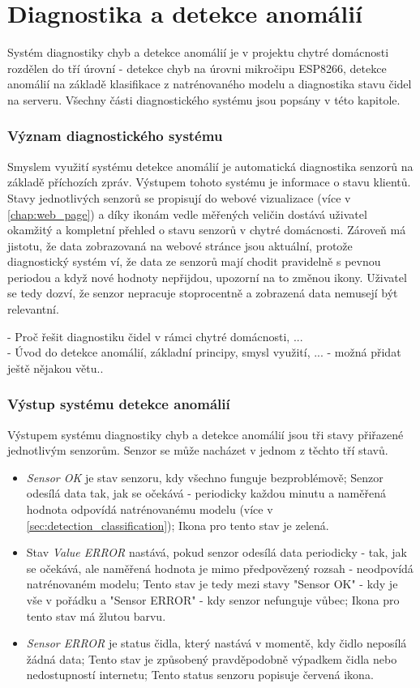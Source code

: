 \chapter{Diagnostika a detekce anomálií} \label{chap:diagnostics}
Systém diagnostiky chyb a detekce anomálií je v projektu chytré domácnosti rozdělen do tří úrovní - detekce chyb na úrovni mikročipu ESP8266, detekce anomálií na základě klasifikace z natrénovaného modelu a diagnostika stavu čidel na serveru. Všechny části diagnostického systému jsou popsány v této kapitole. 

\subsection*{Význam diagnostického systému}
Smyslem využití systému detekce anomálií je automatická diagnostika senzorů na základě příchozích zpráv. Výstupem tohoto systému je informace o stavu klientů. Stavy jednotlivých senzorů se propisují do webové vizualizace (více v \cref{chap:web_page}) a díky ikonám vedle měřených veličin dostává uživatel okamžitý a kompletní přehled o stavu senzorů v chytré domácnosti. Zároveň má jistotu, že data zobrazovaná na webové stránce jsou aktuální, protože diagnostický systém ví, že data ze senzorů mají chodit pravidelně s pevnou periodou a když nové hodnoty nepřijdou, upozorní na to změnou ikony. Uživatel se tedy dozví, že senzor nepracuje stoprocentně a zobrazená data nemusejí být relevantní.

- Proč řešit diagnostiku čidel v rámci chytré domácnosti, ...\\
- Úvod do detekce anomálií, základní principy, smysl využití, ... - možná přidat ještě nějakou větu..

\subsection*{Výstup systému detekce anomálií}
Výstupem systému diagnostiky chyb a detekce anomálií jsou tři stavy přiřazené jednotlivým senzorům. Senzor se může nacházet v jednom z těchto tří stavů. 

\begin{itemize}
  \item \textit{Sensor OK} je stav senzoru, kdy všechno funguje bezproblémově; Senzor odesílá data tak, jak se očekává - periodicky každou minutu a naměřená hodnota odpovídá natrénovanému modelu (více v \cref{sec:detection_classification}); Ikona pro tento stav je zelená.
  \item Stav \textit{Value ERROR} nastává, pokud senzor odesílá data periodicky - tak, jak se očekává, ale naměřená hodnota je mimo předpovězený rozsah - neodpovídá natrénovaném modelu; Tento stav je tedy mezi stavy "Sensor OK" - kdy je vše v pořádku a "Sensor ERROR" - kdy senzor nefunguje vůbec; Ikona pro tento stav má žlutou barvu.
  \item \textit{Sensor ERROR} je status čidla, který nastává v momentě, kdy čidlo neposílá žádná data; Tento stav je způsobený pravděpodobně výpadkem čidla nebo nedostupností internetu; Tento status senzoru popisuje červená ikona.
\end{itemize}

